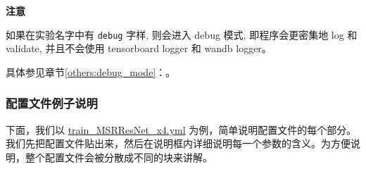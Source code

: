 \documentclass[../main.tex]{subfiles}
\begin{document}
\begin{hl} %
    \textbf{注意}

    如果在实验名字中有 \texttt{debug} 字样, 则会进入 debug 模式, 即程序会更密集地 log 和 validate, 并且不会使用 tensorboard logger 和 wandb logger。

    具体参见章节\ref{others:debug_mode}：。
\end{hl}

\subsubsection{配置文件例子说明}

下面，我们以 \href{https://github.com/XPixelGroup/BasicSR/blob/master/options/train/SRResNet_SRGAN/train_MSRResNet_x4.yml}{train\_MSRResNet\_x4.yml} 为例，简单说明配置文件的每个部分。我们先把配置文件贴出来，然后在说明框内详细说明每一个参数的含义。为方便说明，整个配置文件会被分散成不同的块来讲解。
\end{document}
